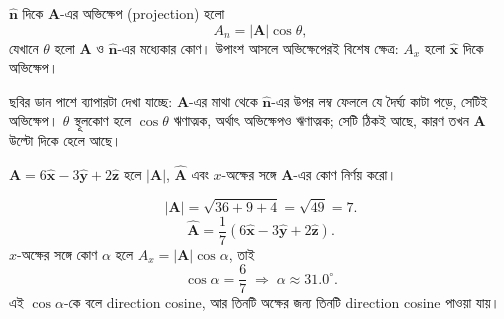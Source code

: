 \documentclass[11pt]{article}
\begin{document}
\begin{center}
\end{center}

\begin{idea}[অভিক্ষেপ]
$\hat{\mathbf{n}}$ দিকে $\mathbf{A}$-এর অভিক্ষেপ (projection) হলো
\[
  A_{n} = |\mathbf{A}|\cos\theta ,
\]
যেখানে $\theta$ হলো $\mathbf{A}$ ও $\hat{\mathbf{n}}$-এর মধ্যেকার কোণ।
উপাংশ আসলে অভিক্ষেপেরই বিশেষ ক্ষেত্র: $A_{x}$ হলো $\hat{\mathbf{x}}$ দিকে
অভিক্ষেপ।
\end{idea}

ছবির ডান পাশে ব্যাপারটা দেখা যাচ্ছে: $\mathbf{A}$-এর মাথা থেকে
$\hat{\mathbf{n}}$-এর উপর লম্ব ফেললে যে দৈর্ঘ্য কাটা পড়ে, সেটিই অভিক্ষেপ।
$\theta$ স্থূলকোণ হলে $\cos\theta$ ঋণাত্মক, অর্থাৎ অভিক্ষেপও ঋণাত্মক; সেটি
ঠিকই আছে, কারণ তখন $\mathbf{A}$ উল্টো দিকে হেলে আছে।

\begin{example}
$\mathbf{A} = 6\hat{\mathbf{x}} - 3\hat{\mathbf{y}} + 2\hat{\mathbf{z}}$
হলে $|\mathbf{A}|$, $\hat{\mathbf{A}}$ এবং $x$-অক্ষের সঙ্গে $\mathbf{A}$-এর
কোণ নির্ণয় করো।
\end{example}

\begin{solbox}
\[
  |\mathbf{A}| = \sqrt{36+9+4} = \sqrt{49} = 7 .
\]
\[
  \hat{\mathbf{A}} = \frac{1}{7}\left( 6\hat{\mathbf{x}}
  - 3\hat{\mathbf{y}} + 2\hat{\mathbf{z}} \right) .
\]
$x$-অক্ষের সঙ্গে কোণ $\alpha$ হলে $A_{x} = |\mathbf{A}|\cos\alpha$, তাই
\[
  \cos\alpha = \frac{6}{7} \;\Longrightarrow\; \alpha \approx 31.0^{\circ} .
\]
এই $\cos\alpha$-কে বলে direction cosine, আর তিনটি অক্ষের জন্য তিনটি
direction cosine পাওয়া যায়।
\end{solbox}
\end{document}
